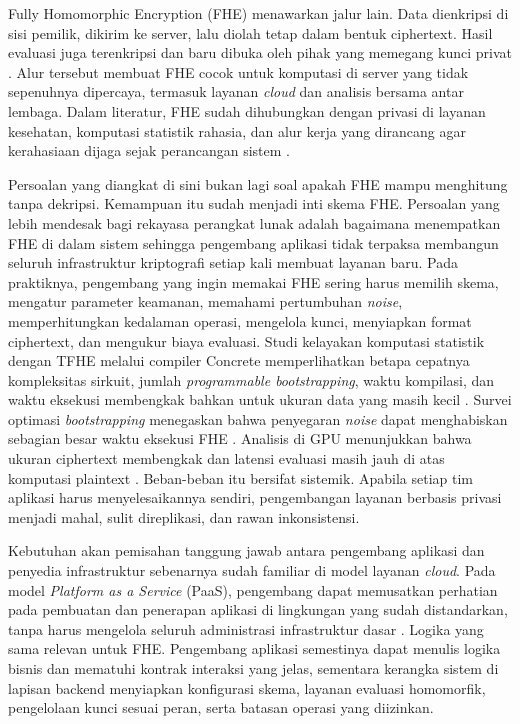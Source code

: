 \documentclass[12pt,a4paper,oneside]{report}
\begin{document}
Fully Homomorphic Encryption (FHE) menawarkan jalur lain. Data dienkripsi di sisi pemilik, dikirim ke server, lalu diolah tetap dalam bentuk ciphertext. Hasil evaluasi juga terenkripsi dan baru dibuka oleh pihak yang memegang kunci privat \cite{fan2026gpuFhe,devi2025privacyHealthcareFhe}. Alur tersebut membuat FHE cocok untuk komputasi di server yang tidak sepenuhnya dipercaya, termasuk layanan \emph{cloud} dan analisis bersama antar lembaga. Dalam literatur, FHE sudah dihubungkan dengan privasi di layanan kesehatan, komputasi statistik rahasia, dan alur kerja yang dirancang agar kerahasiaan dijaga sejak perancangan sistem \cite{devi2025privacyHealthcareFhe,peker2025confidentialStatisticalFhe,vinko2026secureByDesign}.

Persoalan yang diangkat di sini bukan lagi soal apakah FHE mampu menghitung tanpa dekripsi. Kemampuan itu sudah menjadi inti skema FHE. Persoalan yang lebih mendesak bagi rekayasa perangkat lunak adalah bagaimana menempatkan FHE di dalam sistem sehingga pengembang aplikasi tidak terpaksa membangun seluruh infrastruktur kriptografi setiap kali membuat layanan baru. Pada praktiknya, pengembang yang ingin memakai FHE sering harus memilih skema, mengatur parameter keamanan, memahami pertumbuhan \emph{noise}, memperhitungkan kedalaman operasi, mengelola kunci, menyiapkan format ciphertext, dan mengukur biaya evaluasi. Studi kelayakan komputasi statistik dengan TFHE melalui compiler Concrete memperlihatkan betapa cepatnya kompleksitas sirkuit, jumlah \emph{programmable bootstrapping}, waktu kompilasi, dan waktu eksekusi membengkak bahkan untuk ukuran data yang masih kecil \cite{peker2025confidentialStatisticalFhe}. Survei optimasi \emph{bootstrapping} menegaskan bahwa penyegaran \emph{noise} dapat menghabiskan sebagian besar waktu eksekusi FHE \cite{li2026bootstrappingSurvey}. Analisis di GPU menunjukkan bahwa ukuran ciphertext membengkak dan latensi evaluasi masih jauh di atas komputasi plaintext \cite{fan2026gpuFhe}. Beban-beban itu bersifat sistemik. Apabila setiap tim aplikasi harus menyelesaikannya sendiri, pengembangan layanan berbasis privasi menjadi mahal, sulit direplikasi, dan rawan inkonsistensi.

Kebutuhan akan pemisahan tanggung jawab antara pengembang aplikasi dan penyedia infrastruktur sebenarnya sudah familiar di model layanan \emph{cloud}. Pada model \emph{Platform as a Service} (PaaS), pengembang dapat memusatkan perhatian pada pembuatan dan penerapan aplikasi di lingkungan yang sudah distandarkan, tanpa harus mengelola seluruh administrasi infrastruktur dasar \cite{epishkina2025cloudHeArchitecture}. Logika yang sama relevan untuk FHE. Pengembang aplikasi semestinya dapat menulis logika bisnis dan mematuhi kontrak interaksi yang jelas, sementara kerangka sistem di lapisan backend menyiapkan konfigurasi skema, layanan evaluasi homomorfik, pengelolaan kunci sesuai peran, serta batasan operasi yang diizinkan.
\end{document}
